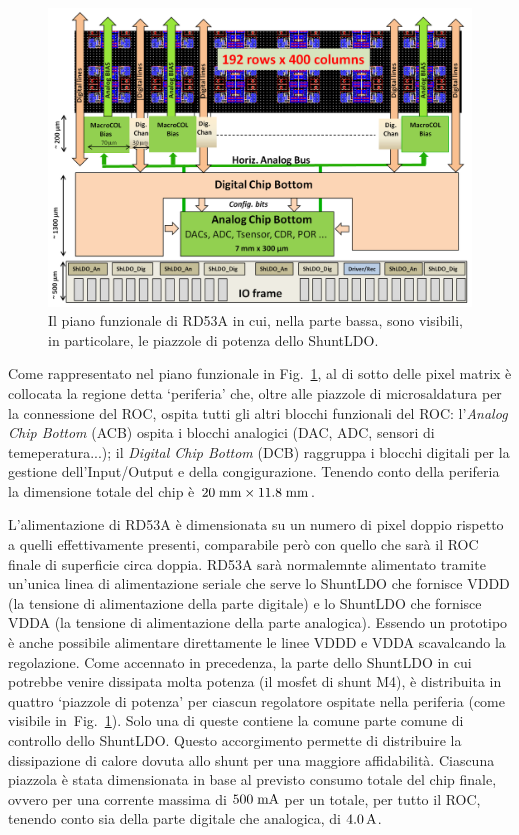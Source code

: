 \begin{figure}
\centering
\includegraphics[scale=.4]{Immagini/RD53Apianofunzionale}
\caption{Il piano funzionale di RD53A in cui, nella parte bassa, sono visibili, in particolare, le piazzole di potenza dello ShuntLDO.}
\label{RD53AFunct}
\end{figure}
Come rappresentato nel piano funzionale in Fig.~\ref{RD53AFunct}, al di sotto delle pixel matrix \`e collocata la regione detta `periferia' che, oltre alle piazzole di microsaldatura per la connessione del ROC, ospita tutti gli altri blocchi funzionali del ROC: l'{\em Analog Chip Bottom} (ACB) ospita i blocchi analogici (DAC, ADC, sensori di temeperatura...); il {\em Digital Chip Bottom} (DCB) raggruppa i blocchi digitali per la gestione dell'Input/Output e della congigurazione. Tenendo conto della periferia la dimensione totale del chip \`e $20\rm \; mm \times 11.8\rm \; mm$.

L'alimentazione di RD53A \`e dimensionata su un numero di pixel doppio rispetto a quelli effettivamente presenti, comparabile per\`o con quello che sar\`a il ROC finale di superficie circa doppia. RD53A sar\`a normalemnte alimentato tramite un'unica linea di alimentazione seriale che serve lo ShuntLDO che fornisce VDDD (la tensione di alimentazione della parte digitale) e lo ShuntLDO che fornisce VDDA (la tensione di alimentazione della parte analogica). Essendo un prototipo \`e anche possibile alimentare direttamente le linee VDDD e VDDA scavalcando la regolazione.
Come accennato in precedenza, la parte dello ShuntLDO in cui potrebbe venire dissipata molta potenza (il mosfet di shunt M4), \`e distribuita in quattro `piazzole di potenza' per ciascun regolatore ospitate nella periferia (come visibile in~Fig.~\ref{RD53AFunct}). Solo una di queste contiene la comune parte comune di controllo dello ShuntLDO. Questo accorgimento permette di distribuire la dissipazione di calore dovuta allo shunt per una maggiore affidabilit\`a. Ciascuna piazzola \`e stata dimensionata in base al previsto consumo totale del chip finale, ovvero per una corrente massima di $500\rm \; mA$ per un totale, per tutto il ROC, tenendo conto sia della parte digitale che analogica, di $4.0\rm \, A$.

